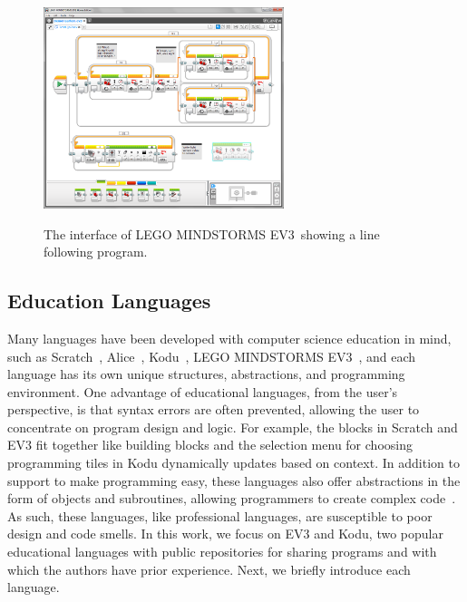\documentclass[conference]{IEEEtran}
\newcommand{\ms}{LEGO MINDSTORMS EV3}
\begin{document}
\begin{figure} [tb]
\caption{The interface of \ms~showing a line following program.}
\centering
\includegraphics[width=7cm]{img/ms}
\label{fig:ms}
\end{figure}

\subsection{Education Languages}

Many languages have been developed with computer science education in mind, such as Scratch~\cite{scratch}, Alice~\cite{aliceIntro}, Kodu~\cite{kodugrammar}, \ms~\cite{lego}, and each language has its own unique structures, abstractions, and programming environment. One advantage of
educational languages, from the user's perspective, is that syntax errors are often prevented, allowing the user to concentrate on program design and logic. For example, the blocks in Scratch and EV3 fit together like building blocks and the selection menu for choosing programming tiles in Kodu dynamically updates based on context. In addition to support to make programming easy, these languages also offer abstractions in the form of objects and subroutines, allowing programmers to create complex code~\cite{Stolee:2011:ECS:1953163.1953197}. As such, these languages, like professional languages, are susceptible to poor design and code smells. In this work, we focus on EV3 and Kodu, two popular educational languages with public repositories for sharing programs and with which the authors have prior experience. Next, we briefly introduce each language. 
\end{document}
